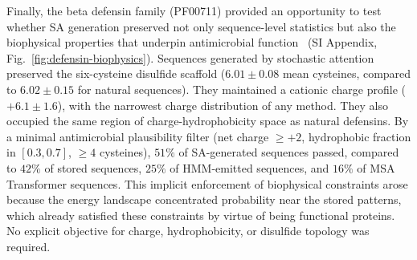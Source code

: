 Finally, the beta defensin family (PF00711) provided an opportunity to test whether SA generation preserved not only sequence-level statistics but also the biophysical properties that underpin antimicrobial function~\cite{lazzaroAntimicrobialPeptides2020} (SI Appendix, Fig.~\ref{fig:defensin-biophysics}). Sequences generated by stochastic attention preserved the six-cysteine disulfide scaffold ($6.01 \pm 0.08$ mean cysteines, compared to $6.02 \pm 0.15$ for natural sequences). They maintained a cationic charge profile ($+6.1 \pm 1.6$), with the narrowest charge distribution of any method. They also occupied the same region of charge-hydrophobicity space as natural defensins. By a minimal antimicrobial plausibility filter (net charge $\geq +2$, hydrophobic fraction in $[0.3, 0.7]$, $\geq 4$ cysteines), $51\%$ of SA-generated sequences passed, compared to $42\%$ of stored sequences, $25\%$ of HMM-emitted sequences, and $16\%$ of MSA Transformer sequences. This implicit enforcement of biophysical constraints arose because the energy landscape concentrated probability near the stored patterns, which already satisfied these constraints by virtue of being functional proteins. No explicit objective for charge, hydrophobicity, or disulfide topology was required.

